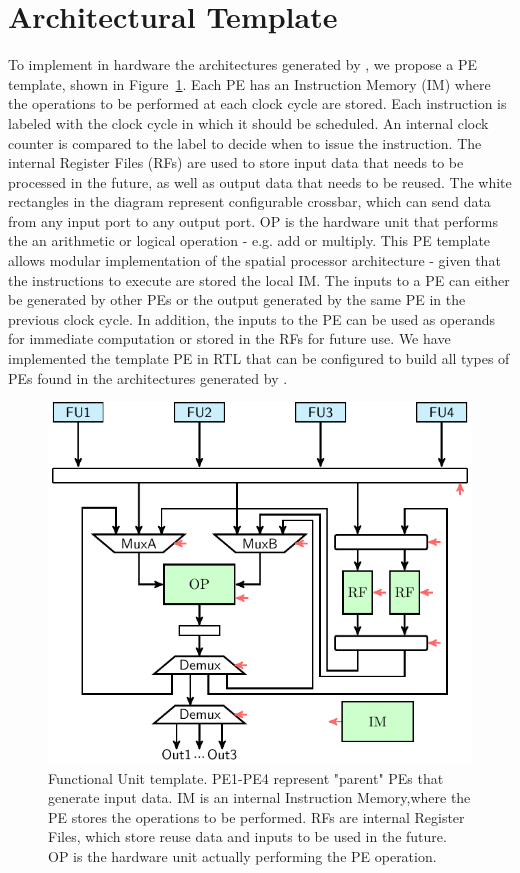 \vspace{-2mm}
\section{Architectural Template}
\label{sec:arch_template}
To implement in hardware the architectures generated by \frameworkname, we propose a PE template, shown in Figure~\ref{fig:FU_templ}. Each PE has an Instruction Memory (IM) where the operations to be performed at each clock cycle are stored. Each instruction is labeled with the clock cycle in which it should be scheduled. An internal clock counter is compared to the label to decide when to issue the instruction. The internal Register Files (RFs) are used to store input data that needs to be processed in the future, as well as output data that needs to be reused. The white rectangles in the diagram represent configurable crossbar, which can send data from any input port to any output port. OP is the hardware unit that performs the an arithmetic or logical operation - e.g. add or multiply. 
This PE template allows modular implementation of the spatial processor architecture - given that the instructions to execute are stored the local IM. The inputs to a PE can either be generated by other PEs or the output generated by the same PE in the previous clock cycle. In addition, the inputs to the PE can be used as operands for immediate computation or stored in the RFs for future use. We have implemented the template PE in RTL that can be configured to build all types of PEs found in the architectures generated by \frameworkname.

\begin{figure}[tb] 
\centering
\includegraphics[width=.7\columnwidth]{images/functional_unit.pdf}
    \caption{\small Functional Unit template. PE1-PE4 represent "parent" PEs that generate input data. IM is an internal Instruction Memory,where the PE stores the operations to be performed. RFs are internal Register Files, which store reuse data and inputs to be used in the future. OP is the hardware unit actually performing the PE operation.}
\label{fig:FU_templ}
\end{figure}

